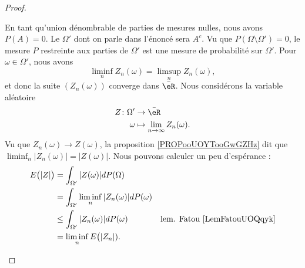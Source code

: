 \begin{proof}
\begin{subproof}

		En tant qu'union dénombrable de parties de mesures nulles, nous avons \( P(A)=0\). Le \( \Omega'\) dont on parle dans l'énoncé sera \( A^c\). Vu que \( P(\Omega\setminus \Omega')=0\), le mesure \( P\) restreinte aux parties de \( \Omega'\) est une mesure de probabilité sur \( \Omega'\). Pour \( \omega\in \Omega'\), nous avons
		\begin{equation}
			\liminf_nZ_n(\omega)=\limsup_nZ_n(\omega),
		\end{equation}
		et donc la suite \( (Z_n(\omega))\) converge dans \( \bar \eR\). Nous considérons la variable aléatoire
		\begin{equation}
			\begin{aligned}
				Z\colon \Omega' & \to \bar \eR                          \\
				\omega          & \mapsto \lim_{n\to\infty}Z_n(\omega).
			\end{aligned}
		\end{equation}
		Vu que \( Z_n(\omega)\to Z(\omega)\), la proposition \ref{PROPooUOYTooGwGZHz} dit que \( \liminf_n| Z_n(\omega) |=| Z(\omega) |\). Nous pouvons calculer un peu d'espérance :
		\begin{subequations}		\label{SUBEQSooPEZEooTDliNe}
			\begin{align}
				E\big( | Z | \big) & =\int_{\Omega'}| Z(\omega) |dP(\Omega)                                                     \\
				                   & =\int_{\Omega'}\liminf_n| Z_n(\omega) |dP(\omega)                                          \\
				                   & \leq \int_{\Omega'}| Z_n(\omega) |dP(\omega)      & \text{lem. Fatou \ref{LemFatouUOQqyk}} \\
				                   & =\liminf_nE\big(| Z_n |).
			\end{align}
		\end{subequations}



\end{subproof}
\end{proof}
